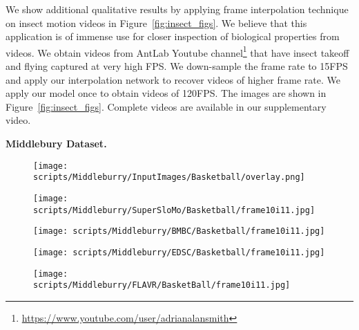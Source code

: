 \documentclass[10pt,twocolumn,letterpaper]{article}
\newcommand{\figref}[1]{Figure~\ref{#1}}
\newcommand{\eightx}{}
\begin{document}
\begin{table*}[!t]
\begin{figure*}[t]
\begin{center}
    
    
    \end{center}
    \caption{{Qualitative Results for \eightx{} video frame interpolation on Insect Motion Videos. Frame at  and  are given as inputs to the network to predict the remaining 7 intermediate frames. Original Videos acquired from \texttt{AntLab} Youtube Channel. }}
    \label{fig:insect_figs}
    \vspace{-6pt}
\end{figure*} We show additional qualitative results by applying frame interpolation technique on insect motion videos in \figref{fig:insect_figs}. We believe that this application is of immense use for closer inspection of biological properties from videos. We obtain videos from AntLab Youtube channel\footnote{\url{https://www.youtube.com/user/adrianalansmith}} that have insect takeoff and flying captured at very high FPS. We down-sample the frame rate to 15FPS and apply our interpolation network to recover videos of higher frame rate. We apply our \eightx{} model once to obtain videos of 120FPS. The images are shown in \figref{fig:insect_figs}. Complete videos are available in our supplementary video.




{\bf Middlebury Dataset.} 



\begin{figure*}[t]
    \begin{center}
    
    \begin{subfigure}[b]{0.18\textwidth}
        \centering
        \texttt{[image: scripts/Middleburry/InputImages/Basketball/overlay.png]}
    \end{subfigure}
    \hfill
    \begin{subfigure}[b]{0.18\textwidth}
        \centering
        \texttt{[image: scripts/Middleburry/SuperSloMo/Basketball/frame10i11.jpg]}
    \end{subfigure}
    \hfill
    \begin{subfigure}[b]{0.18\textwidth}
        \centering
        \texttt{[image: scripts/Middleburry/BMBC/Basketball/frame10i11.jpg]}
    \end{subfigure}
    \hfill
    \begin{subfigure}[b]{0.18\textwidth}
        \centering
        \texttt{[image: scripts/Middleburry/EDSC/Basketball/frame10i11.jpg]}
    \end{subfigure}
    \hfill
    \begin{subfigure}[b]{0.18\textwidth}
        \centering
        \texttt{[image: scripts/Middleburry/FLAVR/BasketBall/frame10i11.jpg]}
    \end{subfigure}



\end{center}
\end{figure*}
\end{table*}
\end{document}
